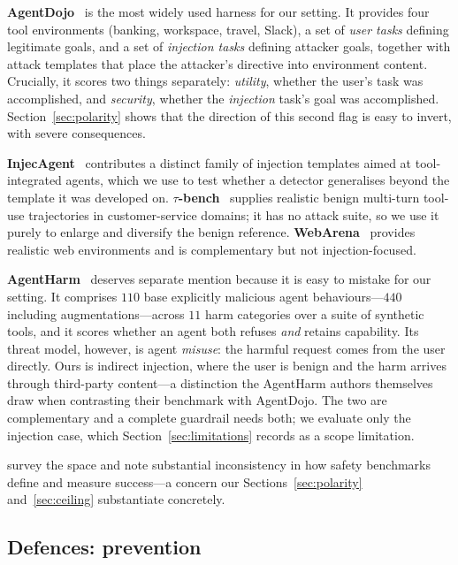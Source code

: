 \documentclass[preprint,12pt,number]{elsarticle}
\theoremstyle{definition}
\begin{document}
\textbf{AgentDojo}~\citep{debenedetti2024agentdojo} is the most widely used
harness for our setting. It provides four tool environments (banking, workspace,
travel, Slack), a set of \emph{user tasks} defining legitimate goals, and a set of
\emph{injection tasks} defining attacker goals, together with attack templates
that place the attacker's directive into environment content. Crucially, it scores
two things separately: \emph{utility}, whether the user's task was accomplished,
and \emph{security}, whether the \emph{injection} task's goal was accomplished.
Section~\ref{sec:polarity} shows that the direction of this second flag is easy
to invert, with severe consequences.

\textbf{InjecAgent}~\citep{zhan2024injecagent} contributes a distinct family of
injection templates aimed at tool-integrated agents, which we use to test whether
a detector generalises beyond the template it was developed on.
\textbf{$\tau$-bench}~\citep{yao2024taubench} supplies realistic benign
multi-turn tool-use trajectories in customer-service domains; it has no attack
suite, so we use it purely to enlarge and diversify the benign reference.
\textbf{WebArena}~\citep{zhou2023webarena} provides realistic web environments
and is complementary but not injection-focused.

\textbf{AgentHarm}~\citep{andriushchenko2025agentharm} deserves separate mention
because it is easy to mistake for our setting. It comprises $110$ base explicitly
malicious agent behaviours---$440$ including augmentations---across $11$ harm categories over
a suite of synthetic tools, and it scores whether an agent both refuses \emph{and}
retains capability. Its threat model, however, is agent \emph{misuse}: the harmful request
comes from the user directly. Ours is indirect injection, where the user is benign
and the harm arrives through third-party content---a distinction the AgentHarm
authors themselves draw when contrasting their benchmark with AgentDojo. The two
are complementary and a complete guardrail needs both; we evaluate only the
injection case, which Section~\ref{sec:limitations} records as a scope
limitation.

\citet{li2026taxonomy} survey the space and note substantial inconsistency in
how safety benchmarks define and measure success---a concern our
Sections~\ref{sec:polarity} and~\ref{sec:ceiling} substantiate concretely.

\subsection{Defences: prevention}
\end{document}
